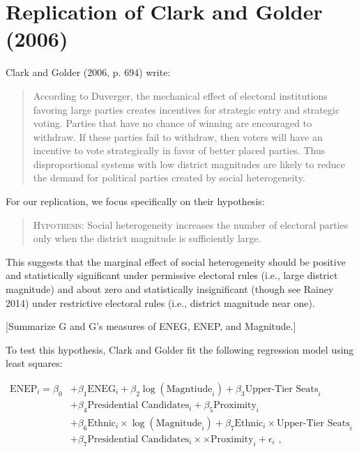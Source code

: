 \documentclass[12pt]{article}
\begin{document}
\section*{Replication of Clark and Golder (2006)}

Clark and Golder (2006, p. 694) write: 

\begin{quote}
According to Duverger, the mechanical effect of electoral institutions favoring large parties creates incentives for strategic entry and strategic voting. Parties that have no chance of winning are encouraged to withdraw. If these parties fail to withdraw, then voters will have an incentive to vote strategically in favor of better placed parties. Thus disproportional systems with low district magnitudes are likely to reduce the demand for political parties created by social heterogeneity.
\end{quote}

For our replication, we focus specifically on their hypothesis:
\begin{quote}
\textsc{Hypothesis:} Social heterogeneity increases the number of electoral parties only when the district magnitude is sufficiently large.
\end{quote}

This suggests that the marginal effect of social heterogeneity should be positive and statistically significant under permissive electoral rules (i.e., large district magnitude) and about zero and statistically insignificant (though see Rainey 2014) under restrictive electoral rules (i.e., district magnitude near one).

[Summarize G and G's measures of ENEG, ENEP, and Magnitude.]

To test this hypothesis, Clark and Golder fit the following regression model using least squares:

\begin{align*}
\text{ENEP}_i = \beta_0 &+ \beta_1 \text{ENEG}_i + \beta_2 \log(\text{Magntiude}_i) + \beta_3 \text{Upper-Tier Seats}_i\\
						     &+\beta_4 \text{Presidential Candidates}_i + \beta_5 \text{Proximity}_i\\
						     &+ \beta_6 \text{Ethnic}_i \times \log (\text{Magnitude}_i) + \beta_7 \text{Ethnic}_i \times \text{Upper-Tier Seats}_i\\
						     &+ \beta_7 \text{Presidential Candidates}_i \times \times \text{Proximity}_i + \epsilon_i\text{ ,}
\end{align*}
\end{document}
